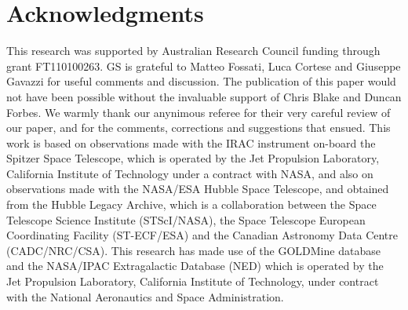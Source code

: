 \documentclass[useAMS,usenatbib,article]{mnras}
\begin{document}
\section{Acknowledgments}
This research was supported by Australian Research Council funding through grant FT110100263. 
GS is grateful to Matteo Fossati, Luca Cortese and Giuseppe Gavazzi for useful comments and discussion. 
The publication of this paper would not have been possible without the invaluable support of 
Chris Blake and Duncan Forbes. 
We warmly thank our anynimous referee for their very careful review of our paper, 
and for the comments, corrections and suggestions that ensued. 
This work is based on observations made with the IRAC instrument \citep{fazio2004IRAC} on-board the Spitzer Space Telescope, 
which is operated by the Jet Propulsion Laboratory, California Institute of Technology under a contract with NASA, 
and also on observations made with the NASA/ESA Hubble Space Telescope, 
and obtained from the Hubble Legacy Archive, 
which is a collaboration between the Space Telescope Science Institute (STScI/NASA), 
the Space Telescope European Coordinating Facility (ST-ECF/ESA) and the Canadian Astronomy Data Centre (CADC/NRC/CSA).
This research has made use of the GOLDMine database \citep{goldmine} and the NASA/IPAC Extragalactic Database (NED) 
which is operated by the Jet Propulsion Laboratory, California Institute of Technology, 
under contract with the National Aeronautics and Space Administration. 

%



\label{lastpage}

\clearpage
\end{document}
